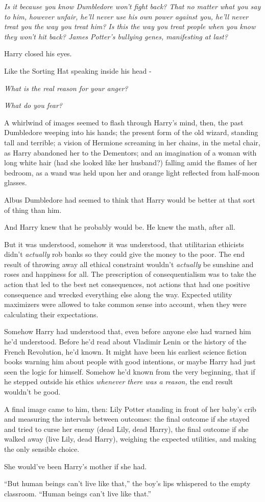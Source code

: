 \emph{Is it because you know Dumbledore won't fight back? That no matter what you say to him, however unfair, he'll never use his own power against you, he'll never treat you the way you treat him? Is this the way you treat people when you know they won't hit back? James Potter's bullying genes, manifesting at last?}

Harry closed his eyes.

Like the Sorting Hat speaking inside his head -

\emph{What is the real reason for your anger?}

\emph{What do you fear?}

A whirlwind of images seemed to flash through Harry's mind, then, the past Dumbledore weeping into his hands; the present form of the old wizard, standing tall and terrible; a vision of Hermione screaming in her chains, in the metal chair, as Harry abandoned her to the Dementors; and an imagination of a woman with long white hair (had she looked like her husband?) falling amid the flames of her bedroom, as a wand was held upon her and orange light reflected from half-moon glasses.

Albus Dumbledore had seemed to think that Harry would be better at that sort of thing than him.

And Harry knew that he probably would be. He knew the math, after all.

But it was understood, somehow it was understood, that utilitarian ethicists didn't \emph{actually} rob banks so they could give the money to the poor. The end result of throwing away all ethical constraint wouldn't \emph{actually} be sunshine and roses and happiness for all. The prescription of consequentialism was to take the action that led to the best net consequences, not actions that had one positive consequence and wrecked everything else along the way. Expected utility maximizers were allowed to take common sense into account, when they were calculating their expectations.

Somehow Harry had understood that, even before anyone else had warned him he'd understood. Before he'd read about Vladimir Lenin or the history of the French Revolution, he'd known. It might have been his earliest science fiction books warning him about people with good intentions, or maybe Harry had just seen the logic for himself. Somehow he'd known from the very beginning, that if he stepped outside his ethics \emph{whenever there was a reason,} the end result wouldn't be good.

A final image came to him, then: Lily Potter standing in front of her baby's crib and measuring the intervals between outcomes: the final outcome if she stayed and tried to curse her enemy (dead Lily, dead Harry), the final outcome if she walked away (live Lily, dead Harry), weighing the expected utilities, and making the only sensible choice.

She would've been Harry's mother if she had.

``But human beings can't live like that,'' the boy's lips whispered to the empty classroom. ``Human beings can't live like that.''
